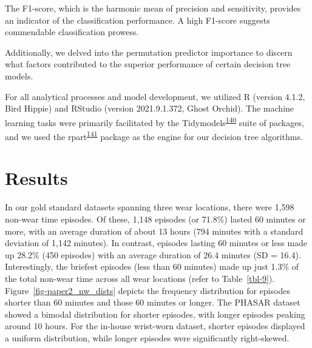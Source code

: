\documentclass[
  10pt,
]{scrbook}
\begin{document}
The F1-score, which is the harmonic mean of precision and sensitivity,
provides an indicator of the classification performance. A high F1-score
suggests commendable classification prowess.

Additionally, we delved into the permutation predictor importance to
discern what factors contributed to the superior performance of certain
decision tree models.

For all analytical processes and model development, we utilized R
(version 4.1.2, Bird Hippie) and RStudio (version 2021.9.1.372, Ghost
Orchid). The machine learning tasks were primarily facilitated by the
Tidymodels\textsuperscript{\protect\hyperlink{ref-kuhn_tidymodels_2020}{140}}
suite of packages, and we used the
rpart\textsuperscript{\protect\hyperlink{ref-rpart}{141}} package as the
engine for our decision tree algorithms.

\hypertarget{results-1}{%
\section{Results}\label{results-1}}

In our gold standard datasets spanning three wear locations, there were
1,598 non-wear time episodes. Of these, 1,148 episodes (or 71.8\%)
lasted 60 minutes or more, with an average duration of about 13 hours
(794 minutes with a standard deviation of 1,142 minutes). In contrast,
episodes lasting 60 minutes or less made up 28.2\% (450 episodes) with
an average duration of 26.4 minutes (SD = 16.4). Interestingly, the
briefest episodes (less than 60 minutes) made up just 1.3\% of the total
non-wear time across all wear locations (refer to Table~\ref{tbl-9}).
Figure~\ref{fig-paper2_nw_dists} depicts the frequency distribution for
episodes shorter than 60 minutes and those 60 minutes or longer. The
PHASAR dataset showed a bimodal distribution for shorter episodes, with
longer episodes peaking around 10 hours. For the in-house wrist-worn
dataset, shorter episodes displayed a uniform distribution, while longer
episodes were significantly right-skewed.

\begingroup

\footnotesize
\end{document}
